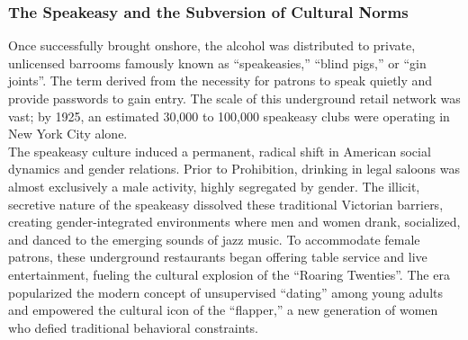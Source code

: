 \documentclass[
]{article}
\begin{document}
\subsubsection{\texorpdfstring{\textbf{The Speakeasy and the Subversion
of Cultural
Norms}}{The Speakeasy and the Subversion of Cultural Norms}}\label{the-speakeasy-and-the-subversion-of-cultural-norms}

Once successfully brought onshore, the alcohol was distributed to
private, unlicensed barrooms famously known as ``speakeasies,'' ``blind
pigs,'' or ``gin joints''. The term derived from the necessity for
patrons to speak quietly and provide passwords to gain entry. The scale
of this underground retail network was vast; by 1925, an estimated
30,000 to 100,000 speakeasy clubs were operating in New York City
alone.\\
The speakeasy culture induced a permanent, radical shift in American
social dynamics and gender relations. Prior to Prohibition, drinking in
legal saloons was almost exclusively a male activity, highly segregated
by gender. The illicit, secretive nature of the speakeasy dissolved
these traditional Victorian barriers, creating gender-integrated
environments where men and women drank, socialized, and danced to the
emerging sounds of jazz music. To accommodate female patrons, these
underground restaurants began offering table service and live
entertainment, fueling the cultural explosion of the ``Roaring
Twenties''. The era popularized the modern concept of unsupervised
``dating'' among young adults and empowered the cultural icon of the
``flapper,'' a new generation of women who defied traditional behavioral
constraints.\\
\end{document}
